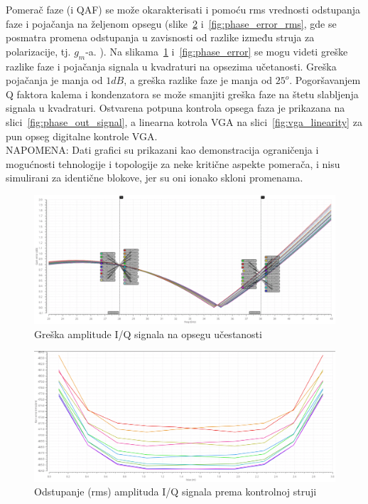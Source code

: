 \documentclass[journal,twocolumn,letterpaper]{IEEEJERM}
\begin{document}
Pomerač faze (i QAF) se može okarakterisati i pomoću rms vrednosti odstupanja faze i pojačanja na željenom opsegu (slike~\ref{fig:gain_error_rms} i~\ref{fig:phase_error_rms}, gde se posmatra promena odstupanja u zavisnosti od razlike između struja za polarizacije, tj. $g_m$-a. ).
Na slikama~\ref{fig:gain_error} i~\ref{fig:phase_error} se mogu videti greške razlike faze i pojačanja signala u kvadraturi na opsezima učetanosti. Greška pojačanja je manja od $1 dB$, a greška razlike faze je manja od $25^o$. Pogoršavanjem Q faktora kalema i kondenzatora se može smanjiti greška faze na štetu slabljenja signala u kvadraturi.  
Ostvarena potpuna kontrola opsega faza je prikazana na slici~\ref{fig:phase_out_signal}, a linearna kotrola VGA na slici~\ref{fig:vga_linearity} za pun opseg digitalne kontrole VGA. \\

NAPOMENA:
Dati grafici su prikazani kao demonstracija ograničenja i mogućnosti tehnologije i topologije za neke kritične aspekte pomerača, i nisu simulirani za identične blokove, jer su oni ionako skloni promenama.


\begin{figure}[!htbp]
  \centering
  \includegraphics[width=\linewidth]{gain_error.png}
  \caption{Greška amplitude I/Q signala na opsegu učestanosti}
  \label{fig:gain_error}
\end{figure}

\begin{figure}[!htbp]
  \centering
  \includegraphics[width=\linewidth]{gain_error_rms.png}
  \caption{Odstupanje (rms) amplituda I/Q signala prema kontrolnoj struji}
  \label{fig:gain_error_rms}
\end{figure}
\end{document}
